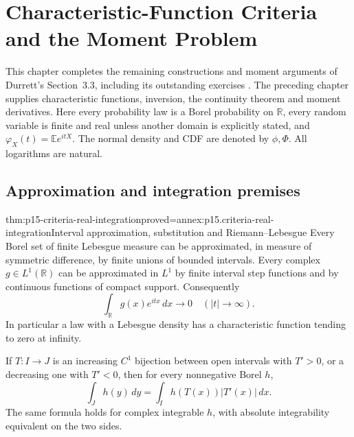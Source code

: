 \chapter{Characteristic-Function Criteria and the Moment Problem}
\label{sec:p15-characteristic-function-criteria-and-moments}

This chapter completes the remaining constructions and moment arguments
of Durrett's Section~3.3, including its outstanding exercises
\cite[pp.~131--143]{DurrettPTEAuthor2019}.
The preceding chapter supplies characteristic functions, inversion,
the continuity theorem and moment derivatives. Here every probability
law is a Borel probability on \(\mathbb R\), every random variable is
finite and real unless another domain is explicitly stated, and
\(\varphi_X(t)=\mathbb E e^{itX}\).
The normal density and CDF are denoted by \(\phi,\Phi\).
All logarithms are natural.

\section{Approximation and integration premises}
\label{sec:p15-criteria-approximation}

\begin{hbtheorem}{thm:p15-criteria-real-integration}{proved=annex:p15.criteria-real-integration}{Interval approximation, substitution and Riemann--Lebesgue}
Every Borel set of finite Lebesgue measure can be approximated,
in measure of symmetric difference, by finite unions of bounded
intervals. Every complex \(g\in L^1(\mathbb R)\) can be approximated
in \(L^1\) by finite interval step functions and by continuous
functions of compact support. Consequently
\[
 \int_{\mathbb R}g(x)e^{itx}\,dx\longrightarrow0
                                         \quad(|t|\to\infty).
\]
In particular a law with a Lebesgue density has a characteristic
function tending to zero at infinity.

If \(T:I\to J\) is an increasing \(C^1\) bijection between open
intervals with \(T'>0\), or a decreasing one with \(T'<0\), then
for every nonnegative Borel \(h\),
\[
 \int_J h(y)\,dy=\int_I h(T(x))|T'(x)|\,dx.
\]
The same formula holds for complex integrable \(h\), with absolute
integrability equivalent on the two sides.
\end{hbtheorem}

